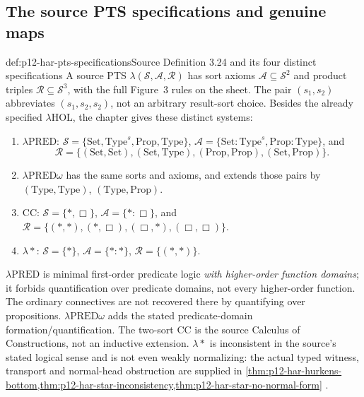 \subsection{The source PTS specifications and genuine maps}

\begin{hbdefinition}{def:p12-har-pts-specifications}{Source Definition 3.24 and its four distinct specifications}
A source PTS \(\lambda(\mathcal S,\mathcal A,\mathcal R)\)
has sort axioms \(\mathcal A\subseteq\mathcal S^2\) and product
triples \(\mathcal R\subseteq\mathcal S^3\), with the full
Figure~3 rules on the sheet. The pair \((s_1,s_2)\) abbreviates
\((s_1,s_2,s_2)\), not an arbitrary result-sort choice.
Besides the already specified \(\lambda\mathrm{HOL}\), the chapter
gives these distinct systems:
\begin{enumerate}
 \item \(\lambda\mathrm{PRED}\):
 \(\mathcal S=\{\mathrm{Set},\mathrm{Type}^s,
 \mathrm{Prop},\mathrm{Type}\}\),
 \(\mathcal A=\{\mathrm{Set}:\mathrm{Type}^s,
 \mathrm{Prop}:\mathrm{Type}\}\), and
 \[
 \mathcal R=\{(\mathrm{Set},\mathrm{Set}),
 (\mathrm{Set},\mathrm{Type}),(\mathrm{Prop},\mathrm{Prop}),
 (\mathrm{Set},\mathrm{Prop})\}.
 \]
 \item \(\lambda\mathrm{PRED}\omega\) has the same sorts and
 axioms, and extends those pairs by
 \((\mathrm{Type},\mathrm{Type})\),
 \((\mathrm{Type},\mathrm{Prop})\).
 \item \(\mathrm{CC}\): \(\mathcal S=\{\ast,\Box\}\),
 \(\mathcal A=\{\ast:\Box\}\), and
 \(\mathcal R=\{(\ast,\ast),(\ast,\Box),
 (\Box,\ast),(\Box,\Box)\}\).
 \item \(\lambda\ast\): \(\mathcal S=\{\ast\}\),
 \(\mathcal A=\{\ast:\ast\}\),
 \(\mathcal R=\{(\ast,\ast)\}\).
\end{enumerate}
\(\lambda\mathrm{PRED}\) is minimal first-order predicate logic
\emph{with higher-order function domains}; it forbids quantification
over predicate domains, not every higher-order function. The ordinary
connectives are not recovered there by quantifying over propositions.
\(\lambda\mathrm{PRED}\omega\) adds the stated predicate-domain
formation/quantification. The two-sort \(\mathrm{CC}\) is the source
Calculus of Constructions, not an inductive extension. \(\lambda\ast\)
is inconsistent in the source's stated logical sense and is not even
weakly normalizing: the actual typed witness, transport and normal-head
obstruction are supplied in
\cref{thm:p12-har-hurkens-bottom,thm:p12-har-star-inconsistency,thm:p12-har-star-no-normal-form}
\cite[pp.~1196--1202]{BarendregtGeuvers2001}.
\end{hbdefinition}

